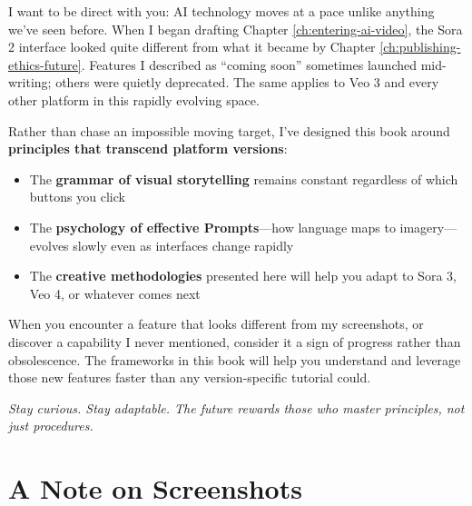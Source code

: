 \documentclass[11pt,a4paper,openright]{book}
\begin{document}
\vspace{0.5em}

I want to be direct with you: AI technology moves at a pace unlike anything we've seen before. When I began drafting Chapter \ref{ch:entering-ai-video}, the Sora 2 interface looked quite different from what it became by Chapter \ref{ch:publishing-ethics-future}. Features I described as ``coming soon'' sometimes launched mid-writing; others were quietly deprecated. The same applies to Veo 3 and every other platform in this rapidly evolving space.

Rather than chase an impossible moving target, I've designed this book around \textbf{principles that transcend platform versions}:

\begin{itemize}
\item The \textbf{grammar of visual storytelling} remains constant regardless of which buttons you click
\item The \textbf{psychology of effective Prompts}—how language maps to imagery—evolves slowly even as interfaces change rapidly
\item The \textbf{creative methodologies} presented here will help you adapt to Sora 3, Veo 4, or whatever comes next
\end{itemize}

When you encounter a feature that looks different from my screenshots, or discover a capability I never mentioned, consider it a sign of progress rather than obsolescence. The frameworks in this book will help you understand and leverage those new features faster than any version-specific tutorial could.

\textit{Stay curious. Stay adaptable. The future rewards those who master principles, not just procedures.}

\section*{A Note on Screenshots}

\begin{center}
\end{center}
\end{document}
